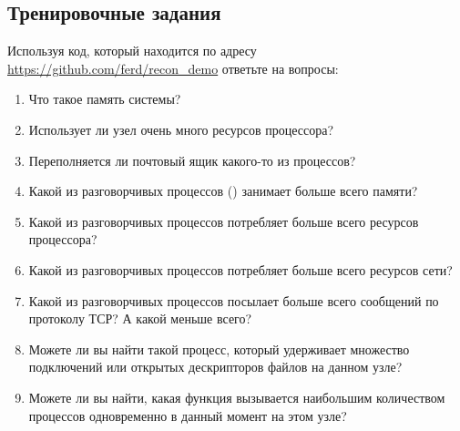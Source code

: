 \documentclass[11pt, oneside]{book}   	%
\newcommand{\HandsOnTitle}{Тренировочные задания}
\begin{document}
\subsection*{\HandsOnTitle{}}

Используя код, который находится по адресу
\href{https://github.com/ferd/recon\_demo}{https://github.com/ferd/recon\_demo}
ответьте на вопросы:

\begin{enumerate}
	\item Что такое память системы?
	\item Использует ли узел очень много ресурсов процессора?
	\item Переполняется ли почтовый ящик какого-то из процессов?
	\item Какой из разговорчивых процессов () занимает больше всего памяти?
	\item Какой из разговорчивых процессов потребляет больше всего ресурсов процессора?
	\item Какой из разговорчивых процессов потребляет больше всего ресурсов сети?
	\item Какой из разговорчивых процессов посылает больше всего сообщений по протоколу ТСР? А какой меньше всего?
	\item Можете ли вы найти такой процесс, который удерживает множество подключений или открытых дескрипторов файлов на данном узле?
	\item Можете ли вы найти, какая функция вызывается наибольшим количеством процессов одновременно в данный момент на этом узле?
\end{enumerate}
\end{document}
